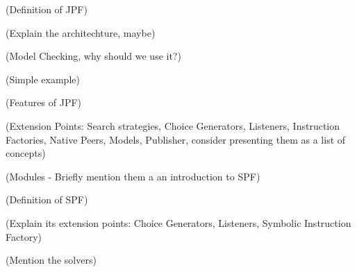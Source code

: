 \label{sec:jpf}

(Definition of JPF) 

(Explain the architechture, maybe)

(Model Checking, why should we use it?)

(Simple example)

(Features of JPF)

(Extension Points: Search strategies, Choice Generators, Listeners, Instruction Factories, Native Peers, Models, Publisher, consider presenting them as a list of concepts)

(Modules - Briefly mention them a an introduction to SPF)

\label{subsec:spf}

(Definition of SPF)

(Explain its extension points: Choice Generators, Listeners, Symbolic Instruction Factory)

(Mention the solvers)







